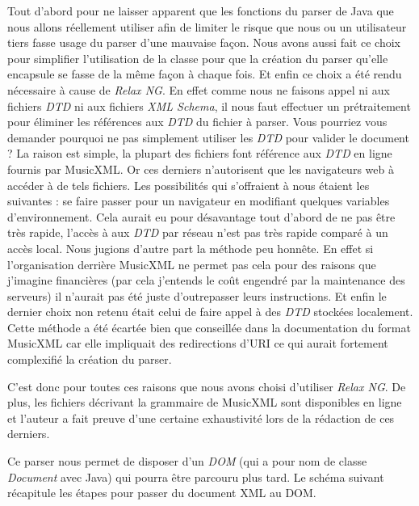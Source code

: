 \par
Tout d'abord pour ne laisser apparent que les fonctions du parser de Java que
nous allons réellement utiliser afin de limiter le risque que nous ou un utilisateur
tiers fasse usage du parser d'une mauvaise façon. Nous avons aussi fait ce choix pour simplifier
l'utilisation de la classe pour que la création du parser qu'elle encapsule se fasse de la même façon à chaque fois.
Et enfin ce choix a été rendu nécessaire à cause de \emph{Relax NG}. En effet comme nous
ne faisons appel ni aux fichiers \emph{DTD} ni aux fichiers \emph{XML Schema}, il nous
faut effectuer un prétraitement pour éliminer les références aux \emph{DTD} du
fichier à parser. Vous pourriez vous demander pourquoi ne pas simplement
utiliser les \emph{DTD} pour valider le document ? La raison est simple,
la plupart des fichiers font référence aux \emph{DTD} en ligne fournis par
MusicXML. Or ces derniers n'autorisent que les navigateurs web à accéder à de tels
fichiers. Les possibilités qui s'offraient à nous étaient les suivantes : se faire
passer pour un navigateur en modifiant quelques variables d’environnement. Cela
aurait eu pour désavantage tout d'abord de ne pas être très rapide, l'accès à
aux \emph{DTD} par réseau n'est pas très rapide comparé à un accès local.
Nous jugions d'autre part la méthode peu honnête. En effet si l'organisation derrière MusicXML
ne permet pas cela pour des raisons que j'imagine financières (par cela j'entends le coût engendré par la maintenance des serveurs)
il n'aurait pas été juste d'outrepasser leurs instructions. Et enfin le dernier choix non retenu était celui de faire appel
à des \emph{DTD} stockées localement. Cette méthode a été écartée bien que conseillée
dans la documentation du format MusicXML car elle impliquait des redirections d'URI
ce qui aurait fortement complexifié la création du parser.



\par
C'est donc pour toutes ces raisons que nous avons choisi d'utiliser \emph{Relax NG}.
De plus, les fichiers décrivant la grammaire de MusicXML sont disponibles en ligne
et l'auteur a fait preuve d'une certaine exhaustivité lors de la rédaction de ces derniers.

\par
Ce parser nous permet de disposer d'un \emph{DOM} (qui a pour nom de classe \emph{Document} avec Java)
qui pourra être parcouru plus tard. Le schéma suivant récapitule les étapes pour passer du document XML au DOM.


